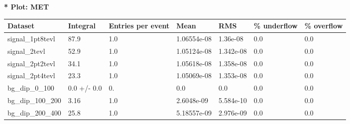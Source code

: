 \documentclass[a4paper, 10pt]{article}
\begin{document}
\textbf{* Plot: MET}\\
   \begin{table}[H]
  \begin{center}
    \begin{tabular}{|m{23.0mm}|m{23.0mm}|m{18.0mm}|m{19.0mm}|m{19.0mm}|m{19.0mm}|m{19.0mm}|}
      \hline
      {\cellcolor{yellow}         Dataset}& {\cellcolor{yellow}         Integral}& {\cellcolor{yellow}         Entries per event}& {\cellcolor{yellow}         Mean}& {\cellcolor{yellow}         RMS}& {\cellcolor{yellow}         \% underflow}& {\cellcolor{yellow}         \% overflow}\\
      \hline
      {\cellcolor{white}         signal\_1pt8tevl}& {\cellcolor{white}         87.9}& {\cellcolor{white}         1.0}& {\cellcolor{white}         1.06554e-08}& {\cellcolor{white}         1.36e-08}& {\cellcolor{green}         0.0}& {\cellcolor{green}         0.0}\\
      \hline
      {\cellcolor{white}         signal\_2tevl}& {\cellcolor{white}         52.9}& {\cellcolor{white}         1.0}& {\cellcolor{white}         1.05124e-08}& {\cellcolor{white}         1.342e-08}& {\cellcolor{green}         0.0}& {\cellcolor{green}         0.0}\\
      \hline
      {\cellcolor{white}         signal\_2pt2tevl}& {\cellcolor{white}         34.1}& {\cellcolor{white}         1.0}& {\cellcolor{white}         1.05618e-08}& {\cellcolor{white}         1.358e-08}& {\cellcolor{green}         0.0}& {\cellcolor{green}         0.0}\\
      \hline
      {\cellcolor{white}         signal\_2pt4tevl}& {\cellcolor{white}         23.3}& {\cellcolor{white}         1.0}& {\cellcolor{white}         1.05069e-08}& {\cellcolor{white}         1.353e-08}& {\cellcolor{green}         0.0}& {\cellcolor{green}         0.0}\\
      \hline
      {\cellcolor{white}         bg\_dip\_0\_100}& {\cellcolor{white}         0.0 +/\-- 0.0}& {\cellcolor{white}         0.}& {\cellcolor{white}         0.0}& {\cellcolor{white}         0.0}& {\cellcolor{green}         0.0}& {\cellcolor{green}         0.0}\\
      \hline
      {\cellcolor{white}         bg\_dip\_100\_200}& {\cellcolor{white}         3.16}& {\cellcolor{white}         1.0}& {\cellcolor{white}         2.6048e-09}& {\cellcolor{white}         5.584e-10}& {\cellcolor{green}         0.0}& {\cellcolor{green}         0.0}\\
      \hline
      {\cellcolor{white}         bg\_dip\_200\_400}& {\cellcolor{white}         25.8}& {\cellcolor{white}         1.0}& {\cellcolor{white}         5.18557e-09}& {\cellcolor{white}         2.976e-09}& {\cellcolor{green}         0.0}& {\cellcolor{green}         0.0}\\

\end{tabular}
\end{center}
\end{table}
\end{document}
